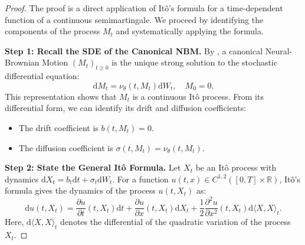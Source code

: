 \documentclass[qian]{imsart}
\newcommand{\R}{\mathbb{R}}
\newcommand{\dd}{\mathrm{d}}
\theoremstyle{plain}
\theoremstyle{definition}
\begin{document}
\begin{proof}
The proof is a direct application of Itô's formula for a time-dependent function of a continuous semimartingale. We proceed by identifying the components of the process $M_t$ and systematically applying the formula.

\textbf{Step 1: Recall the SDE of the Canonical NBM.}
By , a canonical Neural-Brownian Motion $(M_t)_{t \ge 0}$ is the unique strong solution to the stochastic differential equation:
\begin{equation} \label{eq:proof_nbm_sde}
    \dd M_t = \nu_\theta(t, M_t) \dd W_t, \quad M_0 = 0.
\end{equation}
This representation shows that $M_t$ is a continuous Itô process. From its differential form, we can identify its drift and diffusion coefficients:
\begin{itemize}
    \item The drift coefficient is $b(t, M_t) = 0$.
    \item The diffusion coefficient is $\sigma(t, M_t) = \nu_\theta(t, M_t)$.
\end{itemize}

\textbf{Step 2: State the General Itô Formula.}
Let $X_t$ be an Itô process with dynamics $\dd X_t = b_t \dd t + \sigma_t \dd W_t$. For a function $u(t,x) \in C^{1,2}([0,T] \times \R)$, Itô's formula gives the dynamics of the process $u(t, X_t)$ as:
\begin{equation} \label{eq:proof_ito_general}
    \dd u(t, X_t) = \frac{\partial u}{\partial t}(t,X_t) \dd t + \frac{\partial u}{\partial x}(t,X_t) \dd X_t + \frac{1}{2}\frac{\partial^2 u}{\partial x^2}(t,X_t) \dd\langle X, X \rangle_t.
\end{equation}
Here, $\dd\langle X, X \rangle_t$ denotes the differential of the quadratic variation of the process $X_t$.


\end{proof}
\end{document}
